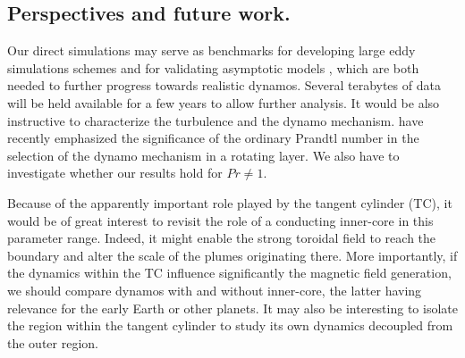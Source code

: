 \documentclass[12pt, a4paper]{article}
\begin{document}






\subsection{Perspectives and future work.}



Our direct simulations may serve as benchmarks for developing large eddy simulations schemes \citep[see e.g.][]{buffett2003, nataf2015, aubert2017} and for validating asymptotic models \citep[e.g.][]{calkins2016}, which are both needed to further progress towards realistic dynamos.
Several terabytes of data will be held available for a few years to allow further analysis.
It would be also instructive to characterize the turbulence and the dynamo mechanism.
\citet{calkins2016} have recently emphasized the significance of the ordinary Prandtl number in the selection of the dynamo mechanism in a rotating layer.
We also have to investigate whether our results hold for $Pr \neq 1$.

Because of the apparently important role played by the tangent cylinder (TC), it would be of great interest to revisit the role of a conducting inner-core in this parameter range.
Indeed, it might enable the strong toroidal field to reach the boundary and alter the scale of the plumes originating there.
More importantly, if the dynamics within the TC influence significantly the magnetic field generation, we should compare dynamos with and without inner-core, the latter having relevance for the early Earth or other planets.
It may also be interesting to isolate the region within the tangent cylinder to study its own dynamics decoupled from the outer region.
\end{document}
